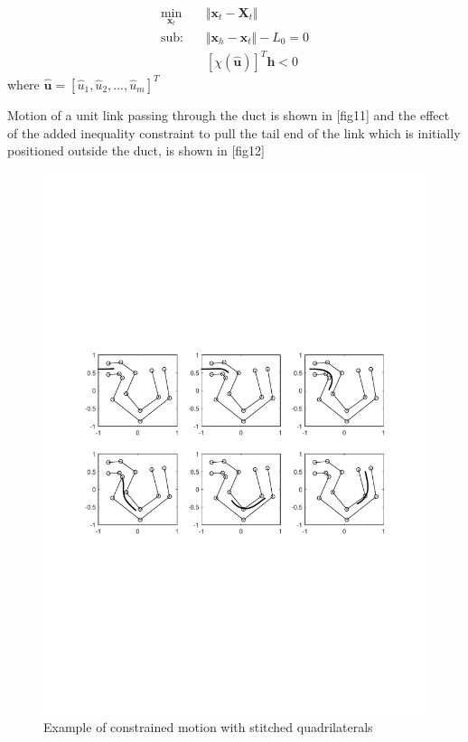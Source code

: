 \documentclass[12pt,a4]{article}
\begin{document}
\begin{align}
\label{eq:min,u,v,im}
\min_{\textbf{x}_t} &\Vert \textbf{x}_t-\textbf{X}_t \Vert\\
\nonumber \text{sub:~~~} &\Vert \textbf{x}_h - \textbf{x}_t \Vert -L_0 = 0\\
&\left[\chi\left(\hat{\mathbf{u}}\right)\right]^T\mathbf{h}<0
\end{align}
where $\hat{\mathbf{u}}=\left[\hat{u}_1,\hat{u}_2,...,\hat{u}_m\right]^T$

Motion of a unit link passing through the duct is shown in [fig11] and the effect of the added inequality constraint to pull the tail end of the link which is initially positioned outside the duct, is shown in [fig12]

\begin{figure}[h]
\centering
\includegraphics[scale=0.75]{figures/fig10.pdf}
\caption{ Example of constrained motion with stitched quadrilaterals \label{fig:motionquads}}
\end{figure}
\end{document}
